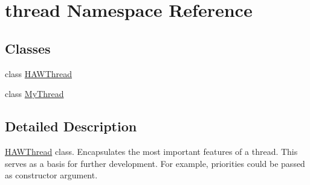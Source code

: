 \hypertarget{namespacethread}{\section{thread Namespace Reference}
\label{namespacethread}
}
\subsection*{Classes}
\begin{DoxyCompactItemize}
\item 
class \hyperlink{classthread_1_1HAWThread}{H\-A\-W\-Thread}
\item 
class \hyperlink{classthread_1_1MyThread}{My\-Thread}
\end{DoxyCompactItemize}


\subsection{Detailed Description}
\hyperlink{classthread_1_1HAWThread}{H\-A\-W\-Thread} class. Encapsulates the most important features of a thread. This serves as a basis for further development. For example, priorities could be passed as constructor argument. 